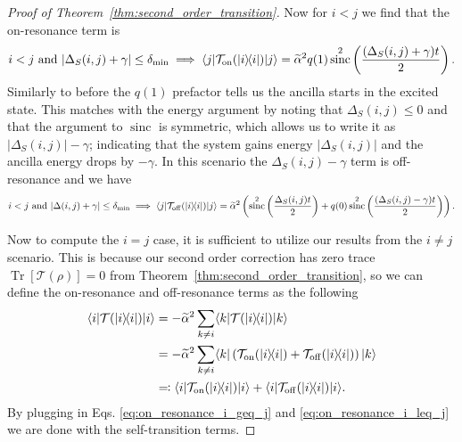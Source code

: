 \documentclass[
 amsmath,amssymb,
 aps,
onecolumn, 
nofootinbib]{revtex4-2}
\newcommand{\on}{\rm on}
\newcommand{\off}{\rm off}
\newcommand{\ket}[1]{|#1\rangle}
\newcommand{\bra}[1]{\langle #1|}
\newcommand{\ketbra}[2]{| #1\rangle\! \langle #2|}
\newcommand{\brackets}[1]{\left[ #1 \right]}
\DeclareMathOperator{\Tr}{Tr}
\newcommand{\trace}[1]{\Tr \brackets{ #1 }}
\DeclareMathOperator{\sinc}{sinc}
\begin{document}
\begin{proof}[Proof of Theorem~\ref{thm:second_order_transition}]
    Now for $i < j$ we find that the on-resonance term is 
    \begin{equation}
    i < j \text{ and } |\Delta_S(i,j) + \gamma| \le \delta_{\min} \implies \bra{j} \mathcal{T}_{\on}(\ketbra{i}{i}) \ket{j} = \widetilde{\alpha}^2 q(1) \sinc^2 \left( \frac{(\Delta_S(i,j) + \gamma)t}{2} \right). \label{eq:on_resonance_i_leq_j}
    \end{equation}
    Similarly to before the $q(1)$ prefactor tells us the ancilla starts in the excited state. This matches with the energy argument by noting that $\Delta_S(i,j) \le 0$ and that the argument to $\sinc$ is symmetric, which allows us to write it as $|\Delta_S(i,j)| - \gamma$; indicating that the system gains energy $|\Delta_S(i,j)|$ and the ancilla energy drops by $-\gamma$. In this scenario the $\Delta_S(i,j) - \gamma$ term is off-resonance and we have
    \begin{align}
        i < j \text{ and } |\Delta(i,j) + \gamma| \le \delta_{\min} \implies  \bra{j} \mathcal{T}_{\off}(\ketbra{i}{i}) \ket{j} = \widetilde{\alpha}^2\left( \sinc^2 \left( \frac{\Delta_S(i,j) t}{2} \right) + q(0) \sinc^2 \left(\frac{(\Delta_S(i,j) - \gamma) t}{2} \right) \right).
    \end{align}


    Now to compute the $i = j$ case, it is sufficient to utilize our results from the $i \neq j$ scenario. This is because our second order correction has zero trace $\trace{\mathcal{T}(\rho)} = 0$ from Theorem~\ref{thm:second_order_transition}, so we can define the on-resonance and off-resonance terms as the following
    \begin{align}
        \bra{i} \mathcal{T}(\ketbra{i}{i}) \ket{i} &= - \widetilde{\alpha}^2 \sum_{k \neq i} \bra{k} \mathcal{T}(\ketbra{i}{i}) \ket{k} \\
        &= - \widetilde{\alpha}^2 \sum_{k \neq i} \bra{k} \left( \mathcal{T}_{\on}(\ketbra{i}{i}) + \mathcal{T}_{\off}(\ketbra{i}{i}) \right) \ket{k} \\
        &\eqqcolon  \bra{i} \mathcal{T}_{\on}(\ketbra{i}{i}) \ket{i} + \bra{i} \mathcal{T}_{\off}(\ketbra{i}{i}) \ket{i}.
    \end{align}
    By plugging in Eqs. \eqref{eq:on_resonance_i_geq_j} and \eqref{eq:on_resonance_i_leq_j} we are done with the self-transition terms. 
\end{proof}
\end{document}
